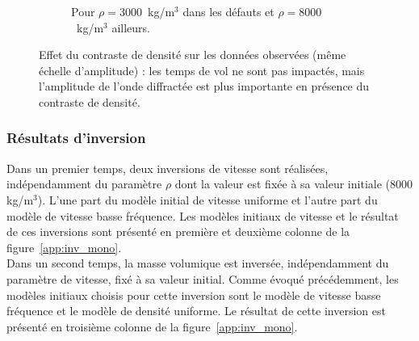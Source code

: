 \begin{figure}[!h]
\begin{subfigure}[b]{0.45\textwidth}
		\caption{Pour $\rho=3000$~kg/m$^{3}$ dans les défauts et $\rho=8000$~kg/m$^{3}$ ailleurs.}
	\end{subfigure}
	\caption{Effet du contraste de densité sur les données observées (même échelle d'amplitude) : les temps de vol ne sont pas impactés, mais l'amplitude de l'onde diffractée est plus importante en présence du contraste de densité. \label{app:traces_rho}}	
\end{figure}

\subsubsection{Résultats d'inversion}

Dans un premier temps, deux inversions de vitesse sont réalisées, indépendamment du paramètre $\rho$ dont la valeur est fixée à sa valeur initiale (8000 kg/m$^{3}$). L'une part du modèle initial de vitesse uniforme  et l'autre part du modèle de vitesse basse fréquence. Les modèles initiaux de vitesse et le résultat de ces inversions sont présenté en première et deuxième colonne de la figure~\ref{app:inv_mono}.\\

Dans un second temps, la masse volumique est inversée, indépendamment du paramètre de vitesse, fixé à sa valeur initial. Comme évoqué précédemment, les modèles initiaux choisis pour cette inversion sont le modèle de vitesse basse fréquence et le modèle de densité uniforme. Le résultat de cette inversion est présenté en troisième colonne de la figure~\ref{app:inv_mono}. \\



